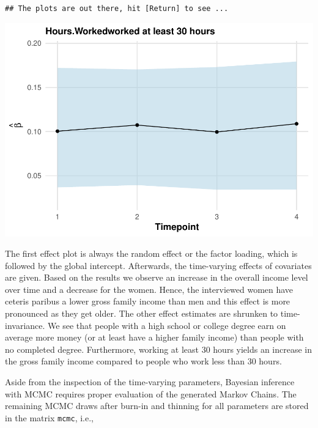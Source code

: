 \documentclass[a4paper, preprint, 3p,
authoryear]{elsarticle} %
\newenvironment{Shaded}{\begin{snugshade}}{\end{snugshade}}
\newcommand{\NormalTok}[1]{#1}
\begin{document}
\begin{verbatim}
## The plots are out there, hit [Return] to see ...
\end{verbatim}

\includegraphics[width=0.7\linewidth]{Vignette-for-panelTVP_files/figure-latex/myplot-5}

The first effect plot is always the random effect or the factor loading,
which is followed by the global intercept. Afterwards, the time-varying
effects of covariates are given. Based on the results we observe an
increase in the overall income level over time and a decrease for the
women. Hence, the interviewed women have ceteris paribus a lower gross
family income than men and this effect is more pronounced as they get
older. The other effect estimates are shrunken to time-invariance. We
see that people with a high school or college degree earn on average
more money (or at least have a higher family income) than people with no
completed degree. Furthermore, working at least 30 hours yields an
increase in the gross family income compared to people who work less
than 30 hours.

Aside from the inspection of the time-varying parameters, Bayesian
inference with MCMC requires proper evaluation of the generated Markov
Chains. The remaining MCMC draws after burn-in and thinning for all
parameters are stored in the matrix \texttt{mcmc}, i.e.,

\begin{Shaded}
\end{Shaded}
\end{document}
